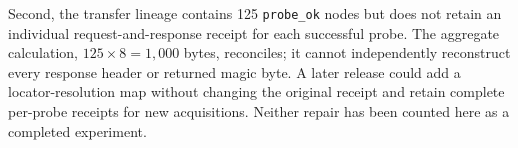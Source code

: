Second, the transfer lineage contains 125 \texttt{probe\_ok} nodes but does not retain an individual request-and-response receipt for each successful probe. The aggregate calculation, $125\times8=1{,}000$ bytes, reconciles; it cannot independently reconstruct every response header or returned magic byte. A later release could add a locator-resolution map without changing the original receipt and retain complete per-probe receipts for new acquisitions. Neither repair has been counted here as a completed experiment.

